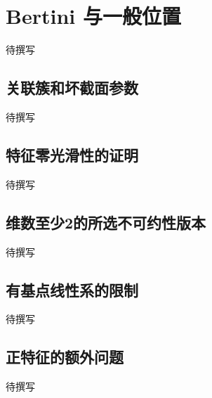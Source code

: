 
% 
% 
% 

\section{Bertini 与一般位置}
\label{g5:sec:1704}

待撰写

\subsection{关联簇和坏截面参数}
\label{g5:subsec:1704:01}
待撰写

\subsection{特征零光滑性的证明}
\label{g5:subsec:1704:02}
待撰写

\subsection{维数至少2的所选不可约性版本}
\label{g5:subsec:1704:03}
待撰写

\subsection{有基点线性系的限制}
\label{g5:subsec:1704:04}
待撰写

\subsection{正特征的额外问题}
\label{g5:subsec:1704:05}
待撰写
